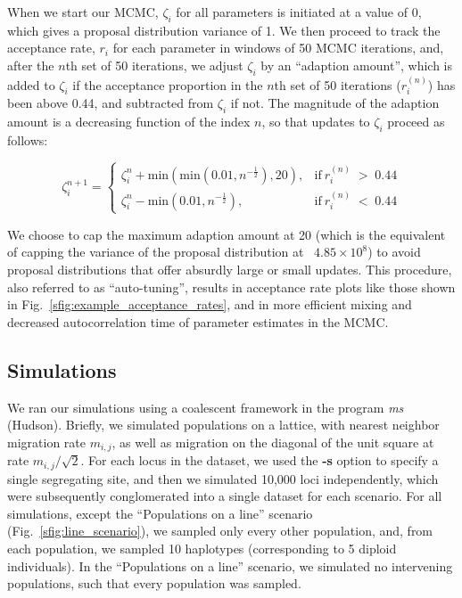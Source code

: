 \documentclass[10pt,letterpaper]{article}
\begin{document}
When we start our MCMC, $\zeta_i$ for all parameters is initiated at a value of 0, which gives a proposal distribution variance of 1.  We then proceed to track the acceptance rate, $r_i$ for each parameter in windows of 50 MCMC iterations, and, after the $n$th set of 50 iterations, we adjust $\zeta_i$ by an ``adaption amount'', which is added to $\zeta_i$ if the acceptance proportion in the $n$th set of 50 iterations ($r^{(n)}_i$) has been above 0.44, and subtracted from $\zeta_i$ if not.  The magnitude of the adaption amount is a decreasing function of the index $n$, so that updates to $\zeta_i$ proceed as follows:

\begin{equation}
\zeta^{n+1}_i =
\begin{cases}
\zeta^{n}_i + \text{min}(\text{min}(0.01,n^{-\frac{1}{2}}),20), & \text{if} \: r^{(n)}_i \; > \; 0.44 \\
\zeta^{n}_i - \text{min}(0.01,n^{-\frac{1}{2}}), & \text{if} \: r^{(n)}_i \; < \; 0.44
\end{cases}
\label{eq:adpative_mcmc}
\end{equation}

We choose to cap the maximum adaption amount at 20 (which is the equivalent of capping the variance of the proposal distribution at ~$4.85 \times 10^8$) to avoid proposal distributions that offer absurdly large or small updates.  This procedure, also referred to as ``auto-tuning'', results in acceptance rate plots like those shown in Fig.\ \ref{sfig:example_acceptance_rates}, and in more efficient mixing and decreased autocorrelation time of parameter estimates in the MCMC.

\subsection*{Simulations}
We ran our simulations using a coalescent framework in the program \textit{ms} (Hudson).  Briefly, we simulated populations on a lattice, with nearest neighbor migration rate $m_{i,j}$, as well as migration on the diagonal of the unit square at rate $m_{i,j}/\sqrt{2}$.  For each locus in the dataset, we used the \textbf{-s} option to specify a single segregating site, and then we simulated 10,000 loci independently, which were subsequently conglomerated into a single dataset for each scenario.  For all simulations, except the ``Populations on a line'' scenario (Fig.\ \ref{sfig:line_scenario}), we sampled only every other population, and, from each population, we sampled 10 haplotypes (corresponding to 5 diploid individuals).  In the ``Populations on a line'' scenario, we simulated no intervening populations, such that every population was sampled.
\end{document}
